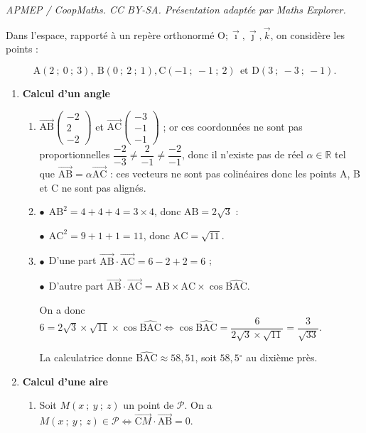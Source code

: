 \documentclass[10pt]{article}
\providecommand{\degres}{\ensuremath{^\circ}}
\providecommand{\R}{\mathbb{R}}
\providecommand{\vect}[1]{\overrightarrow{#1}}
\providecommand{\degres}{{^\circ}}
\providecommand{\Oijk}{\(\mathrm{O};\vec{\imath},\vec{\jmath},\vec{k}\)}
\begin{document}
\noindent\textit{APMEP / CoopMaths. CC BY-SA. Présentation adaptée par Maths Explorer.}\par\medskip
\medskip

Dans l'espace, rapporté à un repère orthonormé \Oijk, on considère les points : 

\[\text{A}(2~;~0~;~3),\: \text{B}(0~;~2~;~1), \text{C}(-1~;~-1~;~2)\:\: \text{et D}(3~;~-3~;~ -1).\]
\smallskip

\begin{enumerate}
\item \textbf{Calcul d'un angle}
	\begin{enumerate}
		\item 
$\vect{\text{AB}}\begin{pmatrix}-2\\2\\-2\end{pmatrix}$ et $\vect{\text{AC}}\begin{pmatrix}-3\\-1\\-1\end{pmatrix}$ ; or ces coordonnées ne sont pas proportionnelles $\dfrac{-2}{-3} \ne \dfrac{2}{-1} \ne \dfrac{-2}{-1}$, donc il n'existe pas de réel $\alpha \in \R$ tel que $\vect{\text{AB}} = \alpha\vect{\text{AC}}$ : ces vecteurs ne sont pas colinéaires donc les points A, B et C ne sont pas alignés.
		\item 
$\bullet~~$$\text{AB}^2 = 4 + 4 + 4 = 3 \times 4$, donc $\text{AB} = 2\sqrt{3}$ :

$\bullet~~$$\text{AC}^2 = 9 + 1 + 1 = 11$, donc $\text{AC} = \sqrt{11}$.
		\item 

$\bullet~~$D'une part $\vect{\text{AB}}\cdot \vect{\text{AC}} = 6 - 2 + 2 = 6$ ;

$\bullet~~$D'autre part $\vect{\text{AB}}\cdot \vect{\text{AC}} = \text{AB} \times \text{AC} \times \cos \widehat{\text{BAC}}$.

On a donc $6 = 2\sqrt{3} \times \sqrt{11} \times \cos \widehat{\text{BAC}} \iff \cos \widehat{\text{BAC}} = \dfrac{6}{2\sqrt{3} \times \sqrt{11}} = \dfrac{3}{\sqrt{33}}$.

La calculatrice donne $\widehat{\text{BAC}} \approx 58,51$, soit $58,5\degres$ au dixième près.
	\end{enumerate}
\item \textbf{Calcul d'une aire}
	\begin{enumerate}
		\item 
		Soit $M(x~;~y~;~z)$ un point de $\mathcal{P}$. On a $M(x~;~y~;~z) \in\mathcal{P} \iff \vect{\text{C}M} \cdot \vect{\text{AB}} = 0$. 
		

\end{enumerate}
\end{enumerate}
\end{document}
